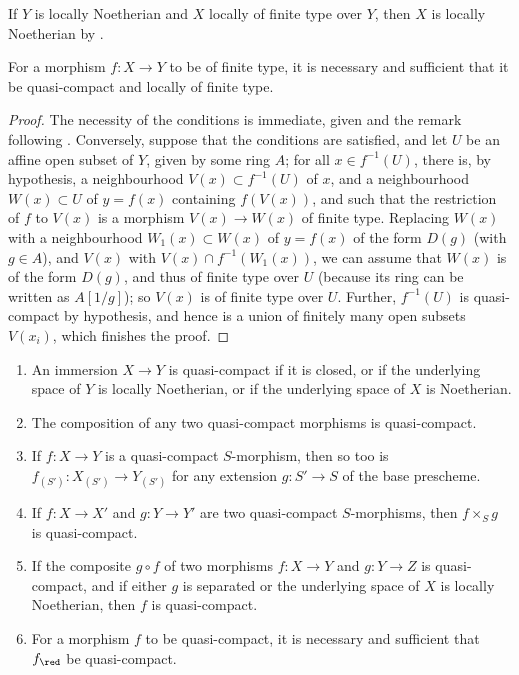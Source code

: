 If $Y$ is locally Noetherian and $X$ locally of finite type over $Y$, then $X$ is locally Noetherian by .

\begin{proposition}[6.6.3]
\label{I.6.6.3}
For a morphism $f: X\to Y$ to be of finite type, it is necessary and sufficient that it be quasi-compact and locally of finite type.
\end{proposition}

\begin{proof}
The necessity of the conditions is immediate, given  and the remark following .
Conversely, suppose that the conditions are satisfied, and let $U$ be an affine open subset of $Y$, given by some ring $A$;
for all $x\in f^{-1}(U)$, there is, by hypothesis, a neighbourhood $V(x)\subset f^{-1}(U)$ of $x$, and a neighbourhood $W(x)\subset U$ of $y=f(x)$ containing $f(V(x))$, and such that the restriction of $f$ to $V(x)$ is a morphism $V(x)\to W(x)$ of finite type.
Replacing $W(x)$ with a neighbourhood $W_1(x)\subset W(x)$ of $y=f(x)$ of the form $D(g)$ (with $g\in A$), and $V(x)$ with $V(x)\cap f^{-1}(W_1(x))$, we can assume that $W(x)$ is of the form $D(g)$, and thus of finite type over $U$ (because its ring can be written as $A[1/g]$);
so $V(x)$ is of finite type over $U$.
Further, $f^{-1}(U)$ is quasi-compact by hypothesis, and hence is a union of finitely many open subsets $V(x_i)$, which finishes the proof.
\end{proof}

\begin{proposition}[6.6.4]
\label{I.6.6.4}
\medskip\noindent
\begin{enumerate}
  \item[{\rm(i)}] An immersion $X\to Y$ is quasi-compact if it is closed, or if the underlying space of $Y$ is locally Noetherian, or if the underlying space of $X$ is Noetherian.
  \item[{\rm(ii)}] The composition of any two quasi-compact morphisms is quasi-compact.
  \item[{\rm(iii)}] If $f: X\to Y$ is a quasi-compact $S$-morphism, then so too is $f_{(S')}: X_{(S')}\to Y_{(S')}$ for any extension $g: S'\to S$ of the base prescheme.
  \item[{\rm(iv)}] If $f:X\to X'$ and $g:Y\to Y'$ are two quasi-compact $S$-morphisms, then $f\times_S g$ is quasi-compact.
  \item[{\rm(v)}] If the composite $g\circ f$ of two morphisms $f: X\to Y$ and $g:Y\to Z$ is quasi-compact, and if either $g$ is separated or the underlying space of $X$ is locally Noetherian, then $f$ is quasi-compact.
  \item[{\rm(vi)}] For a morphism $f$ to be quasi-compact, it is necessary and sufficient that $f_\red$ be quasi-compact.
\end{enumerate}
\end{proposition}

